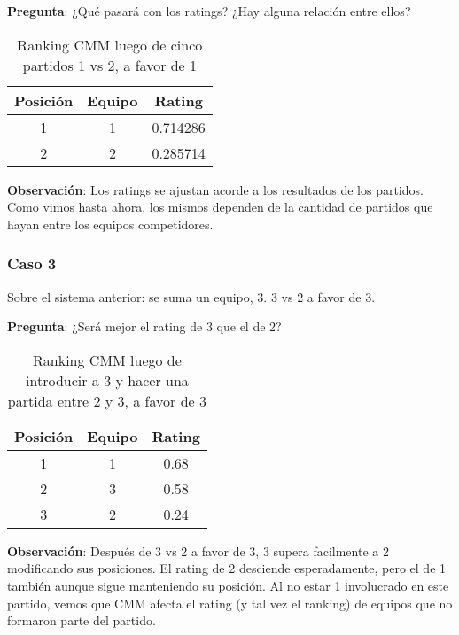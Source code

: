 \textbf{Pregunta}: ¿Qué pasará con los ratings? ¿Hay alguna relación entre ellos?

\begin{table}[h!]
    \begin{center}
        \begin{tabular}{|c|c|c|}
        \hline
        \textbf{Posición} & \textbf{Equipo} & \textbf{Rating} \\
        \hline
        1 & 1 & 0.714286\\
        2 & 2 & 0.285714\\
        \hline
        \end{tabular}
        \caption{Ranking CMM luego de cinco partidos 1 vs 2, a favor de 1}
        \label{cmm_caso_2}
    \end{center}
\end{table}

\textbf{Observación}: Los ratings se ajustan acorde a los resultados de los partidos. Como vimos hasta ahora, los mismos dependen de la cantidad de partidos que hayan entre los equipos competidores.

\subsubsection*{Caso 3}

Sobre el sistema anterior: se suma un equipo, 3. 3 vs 2 a favor de 3.

\textbf{Pregunta}: ¿Será mejor el rating de 3 que el de 2?

\begin{table}[h!]
    \begin{center}
        \begin{tabular}{|c|c|c|}
        \hline
        \textbf{Posición} & \textbf{Equipo} & \textbf{Rating} \\
        \hline
        1 & 1 & 0.68\\
        2 & 3 & 0.58\\
        3 & 2 & 0.24\\
        \hline
        \end{tabular}
        \caption{Ranking CMM luego de introducir a 3 y hacer una partida entre 2 y 3, a favor de 3}
        \label{cmm_caso_3}
    \end{center}
\end{table}

\textbf{Observación}: Después de 3 vs 2 a favor de 3, 3 supera facilmente a 2 modificando sus posiciones. El rating de 2 desciende esperadamente, pero el de 1 también aunque sigue manteniendo su posición. Al no estar 1 involucrado en este partido, vemos que CMM afecta el rating (y tal vez el ranking) de equipos que no formaron parte del partido.


